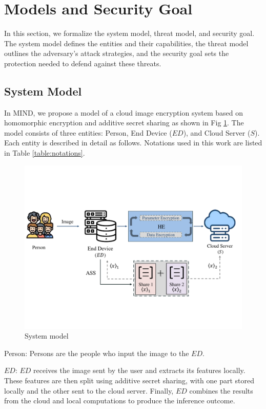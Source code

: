 \documentclass[conference]{IEEEtran}
\begin{document}
\section{Models and Security Goal}
In this section, we formalize the system model, threat model, and security goal. The system model defines the entities and their capabilities, the threat model outlines the adversary's attack strategies, and the security goal sets the protection needed to defend against these threats.
\subsection{System Model}
 In MIND, we propose a model of a cloud image encryption system based on homomorphic encryption and additive secret sharing as shown in Fig \ref{fig:system_model}. The model consists of three entities: Person, End Device ($ED$), and Cloud Server ($S$). Each entity is described in detail as follows. Notations used in this work are listed in Table \ref{table:notations}.
\begin{figure}[ht]
\includegraphics[width=1\linewidth]{fig1.pdf}
\caption{System model} \label{fig:system_model}
\end{figure}

Person: Persons are the people who input the image to the $ED$. 

$ED$: $ED$ receives the image sent by the user and extracts its features locally. These features are then split using additive secret sharing, with one part stored locally and the other sent to the cloud server. Finally, $ED$ combines the results from the cloud and local computations to produce the inference outcome.
\end{document}
